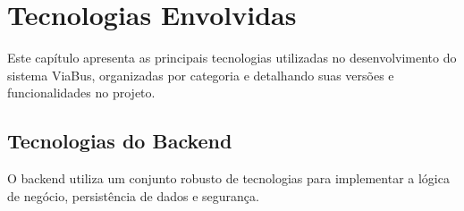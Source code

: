\chapter{Tecnologias Envolvidas} \label{cha:tecnologias}

Este capítulo apresenta as principais tecnologias utilizadas no desenvolvimento do sistema ViaBus, organizadas por categoria e detalhando suas versões e funcionalidades no projeto.

\section{Tecnologias do Backend}

O backend utiliza um conjunto robusto de tecnologias para implementar a lógica de negócio, persistência de dados e segurança.

